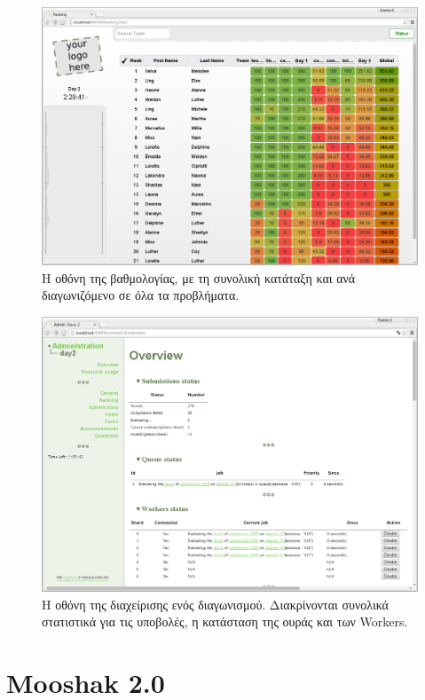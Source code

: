 \documentclass[diploma]{softlab-thesis}
\begin{document}
\begin{figure}
  \centering
  \includegraphics[scale=0.3]{Figures/cmsranking.png}
  \caption[Οθόνη βαθμολογιών CMS]{Η οθόνη της βαθμολογίας, με τη συνολική κατάταξη
  και ανά διαγωνιζόμενο σε όλα τα προβλήματα.}
\end{figure}

\begin{figure}
  \centering
  \includegraphics[scale=0.3]{Figures/cmsadmin.png}
  \caption[Οθόνη διαχείρισης προβλήματος]{Η οθόνη της διαχείρισης ενός διαγωνισμού.
  Διακρίνονται συνολικά στατιστικά για τις υποβολές, η κατάσταση της ουράς και των
  Workers.}
\end{figure}

\FloatBarrier

\section{Mooshak 2.0}
\end{document}
